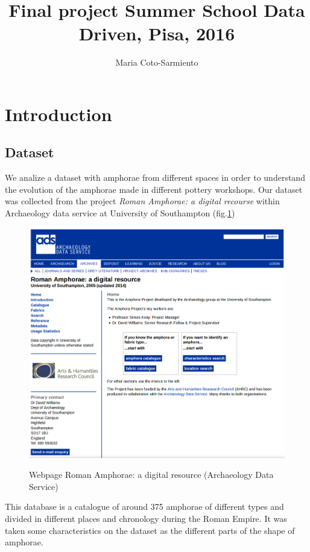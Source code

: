 \documentclass[10pt,a4paper]{article}
\author{Maria Coto-Sarmiento}
\title{Final project Summer School Data Driven, Pisa, 2016}
\begin{document}
\maketitle

\section{Introduction}


\subsection{Dataset}

We analize a dataset with amphorae from different spaces in order to understand the evolution of the amphorae made in different pottery workshops. Our dataset was collected from the project \emph{Roman Amphorae: a digital recourse} within Archaeology data service at University of Southampton (fig.\ref{picwebarch})

\begin{figure}[hbp]
	\centering
\includegraphics[scale=0.30]{picture1.png}
\label{picwebarch}
\caption{Webpage Roman Amphorae: a digital resource (Archaeology Data Service)}
\end{figure} 

This database is a catalogue of around 375 amphorae of different types and divided in different places and chronology during the Roman Empire. It was taken some characteristics on the dataset as the different parts of the shape of amphorae. 
\end{document}
